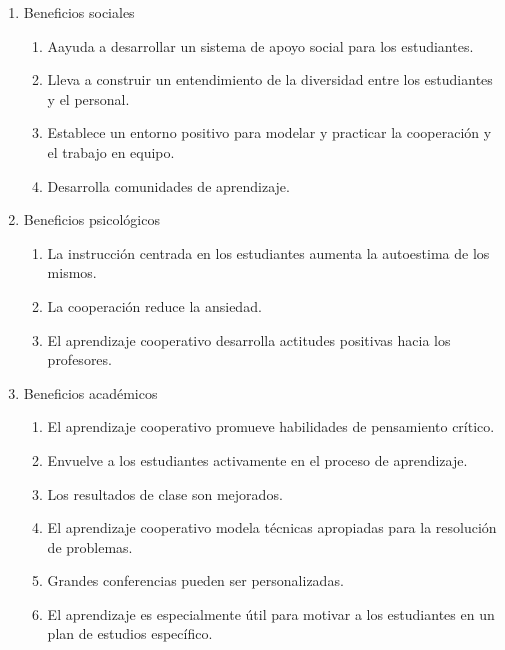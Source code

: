 \begin{enumerate}
  \item Beneficios sociales
  \begin{enumerate}
    \item Aayuda a desarrollar un sistema de apoyo social para los estudiantes.
    \item Lleva a construir un entendimiento de la diversidad entre los estudiantes y el personal.
    \item Establece un entorno positivo para modelar y practicar la cooperación y el trabajo en equipo.
    \item Desarrolla comunidades de aprendizaje.
  \end{enumerate}
  \item Beneficios psicológicos
  \begin{enumerate}
    \item La instrucción centrada en los estudiantes aumenta la autoestima de los mismos.
    \item La cooperación reduce la ansiedad.
    \item El aprendizaje cooperativo desarrolla actitudes positivas hacia los profesores.
  \end{enumerate}
  \item Beneficios académicos
  \begin{enumerate}
    \item El aprendizaje cooperativo promueve habilidades de pensamiento crítico.
    \item Envuelve a los estudiantes activamente en el proceso de aprendizaje.
    \item Los resultados de clase son mejorados.
    \item El aprendizaje cooperativo modela técnicas apropiadas para la resolución de problemas.
    \item Grandes conferencias pueden ser personalizadas.
    \item El aprendizaje es especialmente útil para motivar a los estudiantes en un plan de estudios específico.
  \end{enumerate}
\end{enumerate}














